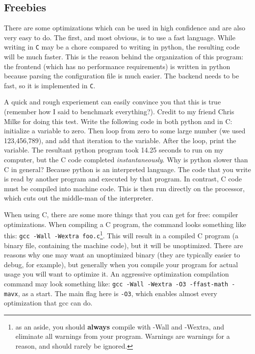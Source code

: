 \documentclass[12pt]{article}
\begin{document}
\subsection{Freebies}

There are some optimizations which can be used in high confidence and are also very easy to do.
The first, and most obvious, is to use a fast language. While writing in \texttt{C} may be a chore
compared to writing in python, the resulting code will be much faster. This is the reason behind the
organization of this program: the frontend (which has no performance requirements) is written in
python because parsing the configuration file is much easier. The backend needs to be fast, so it
is implemented in \texttt{C}.

A quick and rough experiement can easily convince you that this is true (remember how I said to
benchmark everything?). Credit to my friend Chris Milke for doing this test. Write the following
code in both python and in C: initialize a variable to zero. Then loop from zero to some large
number (we used 123,456,789), and add that iteration to the variable. After the loop, print the
variable. The resultant python program took 14.25 seconds to run on my computer, but the C code
completed \textit{instantaneously}. Why is python slower than C in general? Because python is
an interpreted language. The code that you write is read by another program and executed by
that program. In contrast, C code must be compiled into machine code. This is then run directly
on the processor, which cuts out the middle-man of the interpreter.

When using C, there are some more things that you can get for free: compiler optimizations. When
compiling a C program, the command looks something like this: \texttt{gcc -Wall -Wextra foo.c}\footnote{as an aside, you should \textbf{always} compile with -Wall and -Wextra, and eliminate all warnings from your program.
Warnings are warnings for a reason, and should rarely be ignored.}. This will
result in a compiled C program (a binary file, containing the machine code), but it will be
unoptimized. There are reasons why one may want an unoptimized binary (they are typically
easier to debug, for example), but generally when you compile your program for actual usage
you will want to optimize it. An aggressive optimization compilation command may look something
like: \texttt{gcc -Wall -Wextra -O3 -ffast-math -mavx}, as a start. The main flag here is \texttt{-O3}, which
enables almost every optimization that gcc can do.
\end{document}
